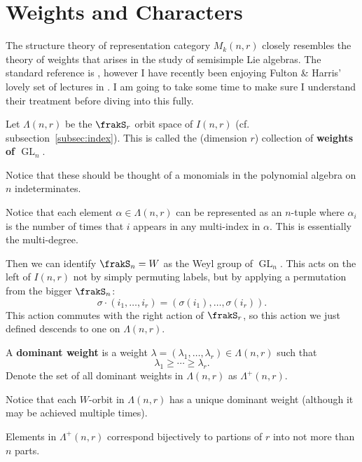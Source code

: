 \documentclass[12pt]{article}
\DeclareMathOperator{\1}{\mathbbm{1}}
\DeclareMathOperator{\GL}{GL}
\begin{document}
\section{Weights and Characters}
The structure theory of representation category $M_k(n,r)$ closely resembles the theory of weights that arises in the study of 
semisimple Lie algebras. The standard reference is \cite{humphreys-liereps}, however I have recently been enjoying Fulton \& Harris' 
lovely set of lectures in \cite{fulton-harris}. I am going to take some time to make sure I understand their treatment before diving into this fully.

\begin{defn}
	Let $\Lambda(n,r)$ be the $\frakS_r$ orbit space of $I(n,r)$ (cf. subsection~\ref{subsec:index}). This is called the (dimension $r$)
	collection of \textbf{weights of $\GL_n$}.

	Notice that these should be thought of a monomials in the polynomial algebra on $n$ indeterminates.
\end{defn}
\begin{rmk}
	Notice that each element $\alpha\in\Lambda(n,r)$ can be represented as an $n$-tuple where $\alpha_i$ is the number of times 
	that $i$ appears in any multi-index in $\alpha$. This is essentially the multi-degree.
\end{rmk}

Then we can identify $\frakS_n=W$ as the Weyl group of $\GL_n$. This acts on the left of $I(n,r)$ not by simply permuting labels, but by applying 
a permutation from the bigger $\frakS_n$:
\[\sigma\cdot(i_1,\dots,i_r)=(\sigma(i_1),\dots,\sigma(i_r)).\]
This action commutes with the right action of $\frakS_r$, so this action we just defined descends to one on $\Lambda(n,r)$.
\begin{defn}
	A \textbf{dominant weight} is a weight $\lambda=(\lambda_1,\dots,\lambda_r)\in\Lambda(n,r)$ such that 
	\[\lambda_1\ge\cdots\ge\lambda_r.\]
	Denote the set of all dominant weights in $\Lambda(n,r)$ as $\Lambda^+(n,r)$.
\end{defn}
\begin{rmk}
	Notice that each $W$-orbit in $\Lambda(n,r)$ has a unique dominant weight (although it may be achieved multiple times).
\end{rmk}
\begin{rmk}
	Elements in $\Lambda^+(n,r)$ correspond bijectively to partions of $r$ into not more than $n$ parts.
\end{rmk}
\end{document}
